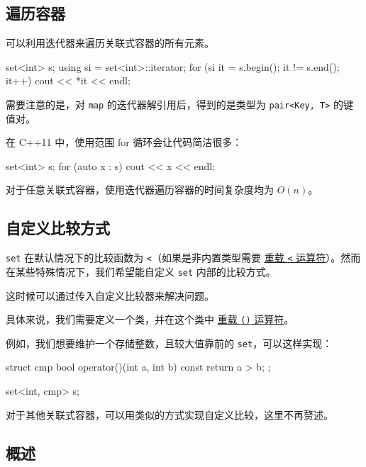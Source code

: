 \subsection{遍历容器}\label{ux904dux5386ux5bb9ux5668}

可以利用迭代器来遍历关联式容器的所有元素。


\begin{codeline}
set<int> s;
using si = set<int>::iterator;
for (si it = s.begin(); it != s.end(); it++) cout << *it << endl;
\end{codeline}


需要注意的是，对 \texttt{map} 的迭代器解引用后，得到的是类型为 \texttt{pair\textless{}Key,\ T\textgreater{}} 的键值对。

在 C++11 中，使用范围 for 循环会让代码简洁很多：


\begin{codeline}
set<int> s;
for (auto x : s) cout << x << endl;
\end{codeline}


对于任意关联式容器，使用迭代器遍历容器的时间复杂度均为 \(O(n)\)。

\subsection{自定义比较方式}\label{ux81eaux5b9aux4e49ux6bd4ux8f83ux65b9ux5f0f}

\texttt{set} 在默认情况下的比较函数为 \texttt{\textless{}}（如果是非内置类型需要 \href{../op-overload.md\#比较运算符}{重载 \texttt{\textless{}} 运算符}）。然而在某些特殊情况下，我们希望能自定义 \texttt{set} 内部的比较方式。

这时候可以通过传入自定义比较器来解决问题。

具体来说，我们需要定义一个类，并在这个类中 \href{../op-overload.md\#函数调用运算符}{重载 \texttt{()} 运算符}。

例如，我们想要维护一个存储整数，且较大值靠前的 \texttt{set}，可以这样实现：


\begin{codeline}
struct cmp {
  bool operator()(int a, int b) const { return a > b; }
};

set<int, cmp> s;
\end{codeline}


对于其他关联式容器，可以用类似的方式实现自定义比较，这里不再赘述。

\subsection{概述}\label{ux6982ux8ff0}

